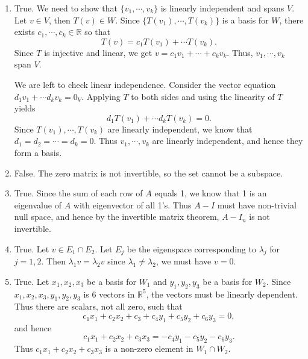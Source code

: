 \documentclass[12pt,letterpaper]{article}
\begin{document}
\begin{enumerate}
\begin{enumerate}
since the last spanning vector is redundant.
\item True.  We need to show that $\{ v_1, \cdots, v_k \}$ is linearly independent and spans $V$.  Let $v \in V$, then $T(v) \in W$.  Since $\{ T(v_1), \cdots, T(v_k)\}$ is a basis for $W$, there exists $c_1, \cdots, c_k \in \mathbb{R}$ so that $$T(v) = c_1 T(v_1) +\cdots T(v_k).$$  Since $T$ is injective and linear, we get $v = c_1 v_1+\cdots +c_k v_k$.  Thus, $v_1, \cdots, v_k$ span $V$.

We are left to check linear independence.  Consider the vector equation $d_1 v_1 + \cdots d_k v_k = 0_V$.  Applying $T$ to both sides and using the linearity of $T$ yields $$d_1 T(v_1) + \cdots d_k T(v_k) = 0.$$  Since $T(v_1), \cdots, T(v_k)$ are linearly independent, we know that $d_1=d_2 = \cdots = d_k =0$.  Thus $v_1, \cdots, v_k$ are linearly independent, and hence they form a basis. 
\item False.  The zero matrix is not invertible, so the set cannot be a subspace.
\item True.  Since the sum of each row of $A$ equals 1, we know that 1 is an eigenvalue of $A$ with eigenvector of all 1's.  Thus $A-I$ must have non-trivial null space, and hence by the invertible matrix theorem, $A-I_n$ is not invertible.
\item True.  Let $v \in E_1 \cap E_2$.  Let $E_j$ be the eigenspace corresponding to $\lambda_j$ for $j=1,2$.  Then $\lambda_1 v =\lambda_2 v$ since $\lambda_1\neq \lambda_2$, we must have $v=0$.
\item True. Let $x_1,x_2,x_3$ be a basis for $W_1$ and $y_1, y_2, y_3$ be a basis for $W_2$. Since $x_1, x_2, x_3, y_1, y_2, y_3$ is 6 vectors in $\mathbb{R}^5$, the vectors must be linearly dependent. Thus there are scalars, not all zero, such that $$c_1 x_1 +c_2 x_2+ c_3 +c_4 y_1+ c_5 y_2+c_6 y_3 =0,$$ and hence  $$c_1 x_1 +c_2 x_2 + c_3 x_3 = -c_4 y_1-c_5 y_2-c_6 y_3.$$ Thus $c_1 x_1 +c_2 x_2 + c_3 x_3$ is a non-zero element in $W_1 \cap W_2$.

\end{enumerate}
\end{enumerate}
\end{document}
